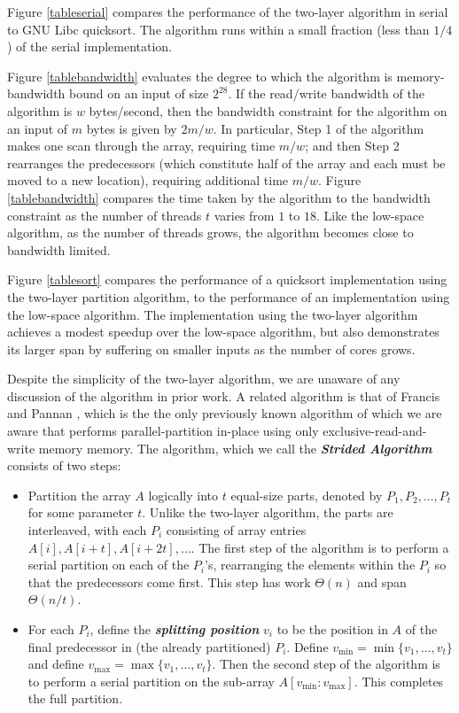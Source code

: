 \documentclass[sigconf]{acmart}
\newcommand{\defn}[1]       {{\textit{\textbf{\boldmath #1}}}}
\renewcommand{\paragraph}[1]{\vspace{0.09in}\noindent{\bf \boldmath #1.}}
\theoremstyle{remark}
\theoremstyle{remark}
\begin{document}
Figure \ref{tableserial} compares the performance of the two-layer
algorithm in serial to GNU Libc quicksort. The algorithm runs within a
small fraction (less than $1/4$) of the serial implementation.

Figure \ref{tablebandwidth} evaluates the degree to which the
algorithm is memory-bandwidth bound on an input of size $2^{28}$. If
the read/write bandwidth of the algorithm is $w$ bytes/second, then
the bandwidth constraint for the algorithm on an input of $m$ bytes is
given by $2m / w$. In particular, Step 1 of the algorithm makes one
scan through the array, requiring time $m / w$; and then Step 2
rearranges the predecessors (which constitute half of the array and
each must be moved to a new location), requiring additional time $m /
w$. Figure \ref{tablebandwidth} compares the time taken by the
algorithm to the bandwidth constraint as the number of threads $t$
varies from $1$ to $18$. Like the low-space algorithm, as the number
of threads grows, the algorithm becomes close to bandwidth limited.

Figure \ref{tablesort} compares the performance of a quicksort
implementation using the two-layer partition algorithm, to the
performance of an implementation using the low-space algorithm. The
implementation using the two-layer algorithm achieves a modest speedup
over the low-space algorithm, but also demonstrates its larger span by
suffering on smaller inputs as the number of cores grows.

\paragraph{Related Algorithms}
Despite the simplicity of the two-layer algorithm, we are unaware of
any discussion of the algorithm in prior work. A related algorithm is
that of Francis and Pannan \cite{FrancisPa92}, which is the the only
previously known algorithm of which we are aware that performs
parallel-partition in-place using only exclusive-read-and-write memory
memory. The algorithm, which we call the \defn{Strided Algorithm}
consists of two steps: 
\begin{itemize}
\item Partition the array $A$ logically into $t$ equal-size parts, denoted by
  $P_1, P_2, \ldots, P_t$ for some parameter $t$. Unlike the two-layer
  algorithm, the parts are interleaved, with each $P_i$ consisting of
  array entries $A[i], A[i + t], A[i + 2t], \ldots$. The first step of
  the algorithm is to perform a serial partition on each of the
  $P_i$'s, rearranging the elements within the $P_i$ so that the
  predecessors come first. This step has work $\Theta(n)$ and span
  $\Theta(n/t)$.
\item For each $P_i$, define the \defn{splitting position} $v_i$ to be
  the position in $A$ of the final predecessor in (the already
  partitioned) $P_i$. Define $v_{\text{min}} = \min\{v_1, \ldots,
  v_t\}$ and define $v_{\text{max}} = \max\{v_1, \ldots, v_t\}$. Then the
  second step of the algorithm is to perform a serial partition on the
  sub-array $A[v_{\text{min}} : v_{\text{max}}]$. This completes the
    full partition.
\end{itemize}
\end{document}
